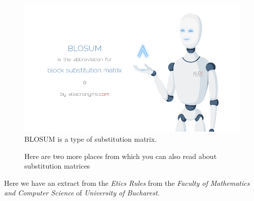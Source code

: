 \documentclass{article}
\begin{document}
\begin{figure}[h!]
  \includegraphics[width=\linewidth]{shiny_BLOSUM.png}
 	BLOSUM is a type of substitution matrix. 
  \label{fig:boat1}
\end{figure}
\newpage

\begin{figure}
\hfill
{}
\hfill
{}
\hfill
\caption{Here are two more places from which you can also read about substitution matrices}
\end{figure}



Here we have an extract from the \textit{Etics Rules} from the \textit{Faculty of Mathematics and Computer Science} of \textit{University of Bucharest}. \cite{Etica}
\end{document}
